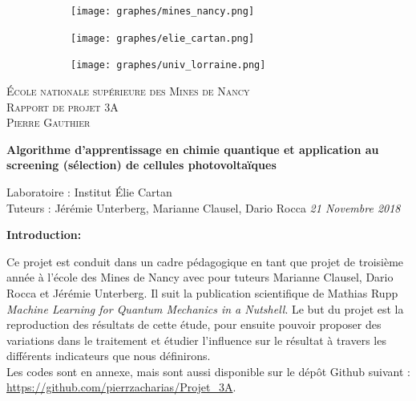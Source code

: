 \documentclass[a4paper,12pt,titlepage]{report}
\begin{document}
\begin{titlepage}
 
	\begin{center}
	\begin{figure}[!h]
	\centering	
		\begin{subfigure}[b]{0.3\textwidth}
		\texttt{[image: graphes/mines\_nancy.png]}
		\end{subfigure}
		\begin{subfigure}[b]{0.3\textwidth}
		\texttt{[image: graphes/elie\_cartan.png]}
		\end{subfigure}
		\begin{subfigure}[b]{0.3\textwidth}
		\texttt{[image: graphes/univ\_lorraine.png]}
	\end{subfigure}
	\end{figure}
 
	\textsc{École nationale supérieure des Mines de Nancy}\\[2cm]
	\textsc{Rapport de projet 3A}\\[1cm]
	\textsc{Pierre Gauthier}\\[1cm]
 
	\begin{doublespace}
		{ \huge \bfseries{Algorithme d'apprentissage en chimie quantique et application au screening (sélection) de cellules photovoltaïques}}\\[2cm]
	\end{doublespace}
	\textmd{Laboratoire : Institut Élie Cartan}\\[1cm]
	\textmd{Tuteurs : Jérémie Unterberg, Marianne Clausel, Dario Rocca}
	\vfill
	{\textit{{\large 21 Novembre 2018}}}
 
	\end{center}
\end{titlepage}

\tableofcontents

\newpage



\textbf{\Huge Introduction:} \\
\newline

Ce projet est conduit dans un cadre pédagogique en tant que projet de troisième année à l'école des Mines de Nancy avec pour tuteurs Marianne Clausel, Dario Rocca et Jérémie Unterberg. Il suit la publication scientifique de Mathias Rupp \textit{Machine Learning for Quantum Mechanics in a Nutshell}.  
Le but du projet est la reproduction des résultats de cette étude, pour ensuite pouvoir proposer des variations dans le traitement et étudier l'influence sur le résultat à travers les différents indicateurs que nous définirons. \\
Les codes sont en annexe, mais sont aussi disponible sur le dépôt Github suivant :  \url{https://github.com/pierrzacharias/Projet_3A}.
\end{document}
